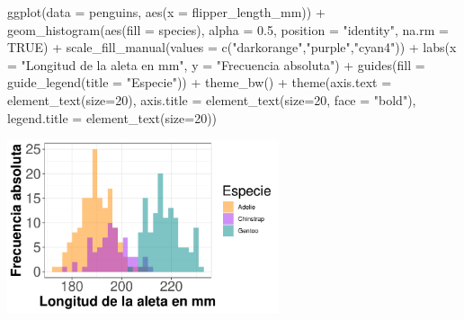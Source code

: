 \documentclass[
  letterpaper,
  DIV=11,
  numbers=noendperiod]{scrreprt}
\newenvironment{Shaded}{\begin{snugshade}}{\end{snugshade}}
\newcommand{\AttributeTok}[1]{\textcolor[rgb]{0.40,0.45,0.13}{#1}}
\newcommand{\ConstantTok}[1]{\textcolor[rgb]{0.56,0.35,0.01}{#1}}
\newcommand{\DecValTok}[1]{\textcolor[rgb]{0.68,0.00,0.00}{#1}}
\newcommand{\FloatTok}[1]{\textcolor[rgb]{0.68,0.00,0.00}{#1}}
\newcommand{\FunctionTok}[1]{\textcolor[rgb]{0.28,0.35,0.67}{#1}}
\newcommand{\NormalTok}[1]{\textcolor[rgb]{0.00,0.23,0.31}{#1}}
\newcommand{\SpecialCharTok}[1]{\textcolor[rgb]{0.37,0.37,0.37}{#1}}
\newcommand{\StringTok}[1]{\textcolor[rgb]{0.13,0.47,0.30}{#1}}
\begin{document}
\begin{Shaded}
\begin{Highlighting}[]
\FunctionTok{ggplot}\NormalTok{(}\AttributeTok{data =}\NormalTok{ penguins, }\FunctionTok{aes}\NormalTok{(}\AttributeTok{x =}\NormalTok{ flipper\_length\_mm)) }\SpecialCharTok{+}
  \FunctionTok{geom\_histogram}\NormalTok{(}\FunctionTok{aes}\NormalTok{(}\AttributeTok{fill =}\NormalTok{ species), }
                 \AttributeTok{alpha =} \FloatTok{0.5}\NormalTok{, }
                 \AttributeTok{position =} \StringTok{"identity"}\NormalTok{,}
                 \AttributeTok{na.rm =} \ConstantTok{TRUE}\NormalTok{) }\SpecialCharTok{+}
  \FunctionTok{scale\_fill\_manual}\NormalTok{(}\AttributeTok{values =} \FunctionTok{c}\NormalTok{(}\StringTok{"darkorange"}\NormalTok{,}\StringTok{"purple"}\NormalTok{,}\StringTok{"cyan4"}\NormalTok{)) }\SpecialCharTok{+}
  \FunctionTok{labs}\NormalTok{(}\AttributeTok{x =} \StringTok{"Longitud de la aleta en mm"}\NormalTok{,}
       \AttributeTok{y =} \StringTok{"Frecuencia absoluta"}\NormalTok{) }\SpecialCharTok{+}
  \FunctionTok{guides}\NormalTok{(}\AttributeTok{fill =} \FunctionTok{guide\_legend}\NormalTok{(}\AttributeTok{title =} \StringTok{"Especie"}\NormalTok{)) }\SpecialCharTok{+}
  \FunctionTok{theme\_bw}\NormalTok{() }\SpecialCharTok{+}
  \FunctionTok{theme}\NormalTok{(}\AttributeTok{axis.text =} \FunctionTok{element\_text}\NormalTok{(}\AttributeTok{size=}\DecValTok{20}\NormalTok{),}
        \AttributeTok{axis.title =} \FunctionTok{element\_text}\NormalTok{(}\AttributeTok{size=}\DecValTok{20}\NormalTok{, }\AttributeTok{face =} \StringTok{"bold"}\NormalTok{),}
        \AttributeTok{legend.title =} \FunctionTok{element\_text}\NormalTok{(}\AttributeTok{size=}\DecValTok{20}\NormalTok{))}
\end{Highlighting}
\end{Shaded}

\begin{center}
\includegraphics[width=0.6\textwidth,height=0.6\textheight]{t1_intro_files/figure-pdf/unnamed-chunk-98-1.pdf}
\end{center}
\end{document}
